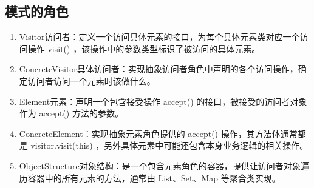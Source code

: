 \subsection{模式的角色}
\begin{enumerate}
	\item Visitor访问者：定义一个访问具体元素的接口，为每个具体元素类对应一个访问操作 visit() ，该操作中的参数类型标识了被访问的具体元素。
	\item ConcreteVisitor具体访问者：实现抽象访问者角色中声明的各个访问操作，确定访问者访问一个元素时该做什么。
	\item Element元素：声明一个包含接受操作 accept() 的接口，被接受的访问者对象作为 accept() 方法的参数。
	\item ConcreteElement：实现抽象元素角色提供的 accept() 操作，其方法体通常都是 visitor.visit(this) ，另外具体元素中可能还包含本身业务逻辑的相关操作。
	\item ObjectStructure对象结构：是一个包含元素角色的容器，提供让访问者对象遍历容器中的所有元素的方法，通常由 List、Set、Map 等聚合类实现。
\end{enumerate}
